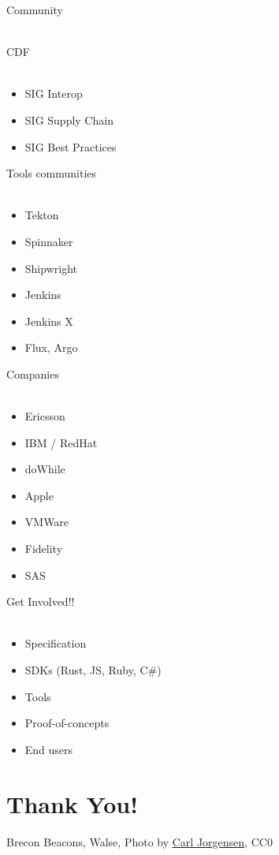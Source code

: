 \documentclass[aspectratio=169,11pt,hyperref={colorlinks=true}]{beamer}
\begin{document}
\begin{stripedframe}%
  {%
  Community
  ~ \\
  ~ \\
  }%
  {%
  CDF \\
  ~
  \begin{itemize}
    \item SIG Interop
    \item SIG Supply Chain
    \item SIG Best Practices
  \end{itemize}
  }%
  {%
  Tools communities \\
  ~
  \begin{itemize}
    \item Tekton
    \item Spinnaker
    \item Shipwright
    \item Jenkins
    \item Jenkins X
    \item Flux, Argo
  \end{itemize}
  }%
  {%
  Companies \\
  ~
  \begin{itemize}
    \item Ericsson
    \item IBM / RedHat
    \item doWhile
    \item Apple
    \item VMWare
    \item Fidelity
    \item SAS
  \end{itemize}
  }%
  {%
  Get Involved!! \\
  ~
  \begin{itemize}
    \item Specification
    \item SDKs (Rust, JS, Ruby, C\#)
    \item Tools
    \item Proof-of-concepts
    \item End users
  \end{itemize}
  }%
\end{stripedframe}

\section[Thank You]{Thank You!}

\begin{sectionwithpiclargecentral}{Brecon Beacons, Walse, Photo by \href{https://unsplash.com/@scamartist}{\underline{Carl Jorgensen}}, CC0}
\end{sectionwithpiclargecentral}
\end{document}
